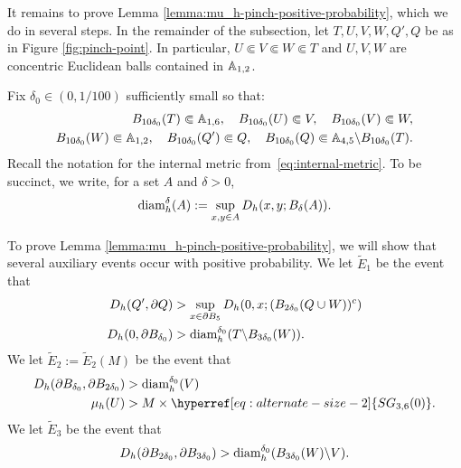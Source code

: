 \documentclass[12pt]{amsart}
\numberwithin{equation}{section}
\newcommand{\SGrho}[2]{\hyperref[eq:alternate-size-2]{SG_{#1}(#2)}}
\begin{document}
	It remains to prove Lemma \ref{lemma:mu_h-pinch-positive-probability}, which we do in several steps. 
	In the remainder of the subsection, let $T,U,V,W, Q', Q$ be as in Figure \ref{fig:pinch-point}.
	In particular, $U \Subset V \Subset W \Subset T$ and $U,V,W$ are concentric Euclidean balls contained in $\mathbb{A}_{1,2}$.
	
	Fix $\delta_0 \in (0, 1/100)$ sufficiently small so that:
	\begin{align} \label{eq:metric-delta0-choice}
	B_{10 \delta_0}(T) \Subset \mathbb{A}_{1, 6} ,\quad
	B_{10 \delta_0}(U) \Subset V ,\quad
	B_{10 \delta_0}(V) \Subset W ,\notag\\
	B_{10 \delta_0}(W) \Subset \mathbb{A}_{1,2} ,\quad
	B_{10 \delta_0}(Q') \Subset Q ,\quad
	B_{10 \delta_0}(Q) \Subset \mathbb{A}_{4,5} \backslash B_{10 \delta_0}(T) .
	\end{align}  
	Recall the notation for the internal metric from~\eqref{eq:internal-metric}.
	To be succinct, we write, for a set $A$ and $\delta > 0$, 
	\begin{equation}
	{\mbox{diam}}^\delta_h(A) := \sup_{x, y \in A} D_h(x,y; B_{\delta}(A)).
	\end{equation} 
	
	To prove Lemma \ref{lemma:mu_h-pinch-positive-probability}, we will show that several auxiliary events occur with positive probability. 
	We let $\tilde E_1$ be the event that
	\begin{equation} \label{eq:first-event}
	\begin{aligned}
	D_h(Q', \partial Q) &> \sup_{x \in \partial B_{5}} D_h(0, x; (B_{2 \delta_0}(Q \cup W))^c) \\
	D_h(0, \partial B_{\delta_0}) &> {\mbox{diam}}^{\delta_0}_h(T \backslash B_{3 \delta_0}(W)) .
	\end{aligned}
	\end{equation}
	We let $\tilde E_2 := \tilde E_2(M)$ be the event that
	\begin{equation} \label{eq:second-event}
	\begin{aligned}
	D_h(\partial B_{\delta_0}, \partial B_{2 \delta_0}) &> \diam^{\delta_0}_h(V)  \\
	\mu_h(U) &> M \times \SGrho{3,6}{0} .
	\end{aligned}
	\end{equation} 
	We let $\tilde E_3$ be the event that
	\begin{equation} \label{eq:third-event}
	D_h(\partial B_{2 \delta_0}, \partial B_{3 \delta_0}) > {\mbox{diam}}_h^{\delta_0}(B_{3\delta_0}(W) \backslash V).
	\end{equation}
	
\end{document}
